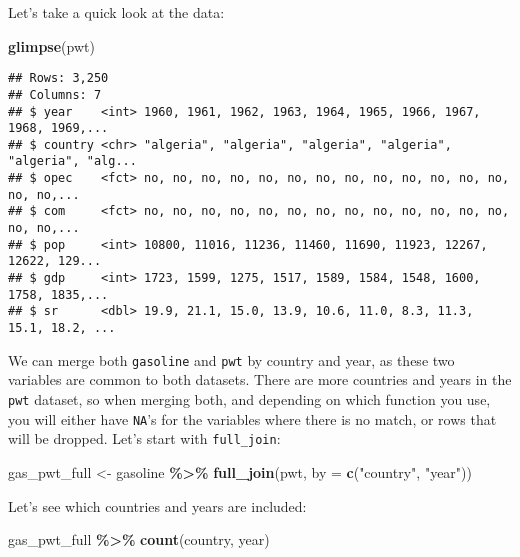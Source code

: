 \documentclass[
]{article}
\newenvironment{Shaded}{\begin{snugshade}}{\end{snugshade}}
\newcommand{\DataTypeTok}[1]{\textcolor[rgb]{0.13,0.29,0.53}{#1}}
\newcommand{\KeywordTok}[1]{\textcolor[rgb]{0.13,0.29,0.53}{\textbf{#1}}}
\newcommand{\NormalTok}[1]{#1}
\newcommand{\OperatorTok}[1]{\textcolor[rgb]{0.81,0.36,0.00}{\textbf{#1}}}
\newcommand{\StringTok}[1]{\textcolor[rgb]{0.31,0.60,0.02}{#1}}
\begin{document}
Let's take a quick look at the data:

\begin{Shaded}
\begin{Highlighting}[]
\KeywordTok{glimpse}\NormalTok{(pwt)}
\end{Highlighting}
\end{Shaded}

\begin{verbatim}
## Rows: 3,250
## Columns: 7
## $ year    <int> 1960, 1961, 1962, 1963, 1964, 1965, 1966, 1967, 1968, 1969,...
## $ country <chr> "algeria", "algeria", "algeria", "algeria", "algeria", "alg...
## $ opec    <fct> no, no, no, no, no, no, no, no, no, no, no, no, no, no, no,...
## $ com     <fct> no, no, no, no, no, no, no, no, no, no, no, no, no, no, no,...
## $ pop     <int> 10800, 11016, 11236, 11460, 11690, 11923, 12267, 12622, 129...
## $ gdp     <int> 1723, 1599, 1275, 1517, 1589, 1584, 1548, 1600, 1758, 1835,...
## $ sr      <dbl> 19.9, 21.1, 15.0, 13.9, 10.6, 11.0, 8.3, 11.3, 15.1, 18.2, ...
\end{verbatim}

We can merge both \texttt{gasoline} and \texttt{pwt} by country and year, as these two variables are common to
both datasets. There are more countries and years in the \texttt{pwt} dataset, so when merging both, and
depending on which function you use, you will either have \texttt{NA}'s for the variables where there is
no match, or rows that will be dropped. Let's start with \texttt{full\_join}:

\begin{Shaded}
\begin{Highlighting}[]
\NormalTok{gas\_pwt\_full \textless{}{-}}\StringTok{ }\NormalTok{gasoline }\OperatorTok{\%\textgreater{}\%}
\StringTok{  }\KeywordTok{full\_join}\NormalTok{(pwt, }\DataTypeTok{by =} \KeywordTok{c}\NormalTok{(}\StringTok{"country"}\NormalTok{, }\StringTok{"year"}\NormalTok{))}
\end{Highlighting}
\end{Shaded}

Let's see which countries and years are included:

\begin{Shaded}
\begin{Highlighting}[]
\NormalTok{gas\_pwt\_full }\OperatorTok{\%\textgreater{}\%}
\StringTok{  }\KeywordTok{count}\NormalTok{(country, year)}
\end{Highlighting}
\end{Shaded}
\end{document}
